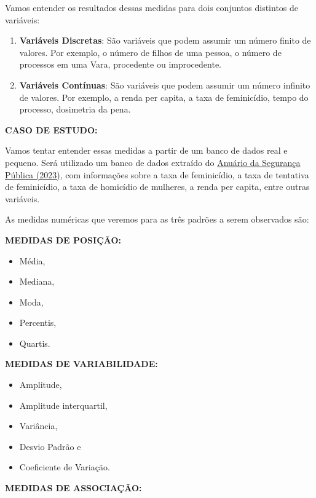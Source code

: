 \documentclass[
  letterpaper,
  DIV=11,
  numbers=noendperiod]{scrreprt}
\providecommand{\tightlist}{%
  \setlength{\itemsep}{0pt}\setlength{\parskip}{0pt}}
\begin{document}
Vamos entender os resultados dessas medidas para dois conjuntos
distintos de variáveis:

\begin{enumerate}
\def\labelenumi{\arabic{enumi}.}
\item
  \textbf{Variáveis Discretas}: São variáveis que podem assumir um
  número finito de valores. Por exemplo, o número de filhos de uma
  pessoa, o número de processos em uma Vara, procedente ou improcedente.
\item
  \textbf{Variáveis Contínuas}: São variáveis que podem assumir um
  número infinito de valores. Por exemplo, a renda per capita, a taxa de
  feminicídio, tempo do processo, dosimetria da pena.
\end{enumerate}

\textbf{CASO DE ESTUDO:}

Vamos tentar entender essas medidas a partir de um banco de dados real e
pequeno. Será utilizado um banco de dados extraído do
\href{https://publicacoes.forumseguranca.org.br/items/6b3e3a1b-3bd2-40f7-b280-7419c8eb3b39}{Anuário
da Segurança Pública (2023)}, com informações sobre a taxa de
feminicídio, a taxa de tentativa de feminicídio, a taxa de homicídio de
mulheres, a renda per capita, entre outras variáveis.

As medidas numéricas que veremos para as três padrões a serem observados
são:

\textbf{MEDIDAS DE POSIÇÃO:}

\begin{itemize}
\tightlist
\item
  Média,
\item
  Mediana,
\item
  Moda,
\item
  Percentis,
\item
  Quartis.
\end{itemize}

\textbf{MEDIDAS DE VARIABILIDADE:}

\begin{itemize}
\tightlist
\item
  Amplitude,
\item
  Amplitude interquartil,
\item
  Variância,
\item
  Desvio Padrão e
\item
  Coeficiente de Variação.
\end{itemize}

\textbf{MEDIDAS DE ASSOCIAÇÃO:}
\end{document}
